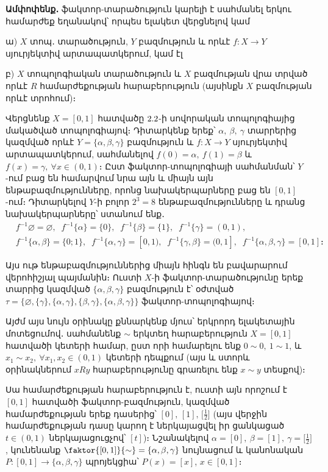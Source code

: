 \documentclass[./main.tex]{subfiles}
\begin{document}
\par \textbf{Ամփոփենք․} ֆակտոր-տարածություն կարելի է սահմանել երկու համարժեք եղա\-նա\-կով՝ որպես ելակետ վերցնելով կամ 
\par ա) $X$ տոպ․ տարածություն, $Y$ բազմություն և որևէ $f:X\to Y$ սյուրյեկտիվ արտապատ\-կերում, կամ էլ 
\par բ) $X$ տոպոլոգիական տարածություն և $X$ բազմության վրա տրված որևէ $R$ հա\-մար\-ժե\-քութ\-յան հարաբերություն (այսինքն $X$ բազմության որևէ տրոհում)։ 
\begin{example}\label{ch12ex1}
\par Վերցնենք $X=[0, 1]$ հատվածը $2.2$-ի սովորական տոպոլոգիայից մա\-կածված տոպոլոգիայով։ Դիտարկենք երեք՝ $\alpha,\ \beta,\ \gamma$ տարրերից կազմված որևէ $ Y=\{\alpha,\beta,\gamma\}$ բազմություն և $f:X\to Y$ սյուրյեկտիվ արտապատկերում, սահմանե\-լով $f(0)=\alpha,\ f(1)=\beta$ և $f(x)=\gamma,\ \forall x \in (0,1)$։ Ըստ ֆակտոր-տոպոլո\-գիայի սահ\-ման\-ման՝ $Y$-ում բաց են համարվում նրա այն և միայն այն ենթաբազմությունները, որոնց նախակերպարները բաց են $[0,1]$-ում։ Դիտարկելով $Y$-ի բոլոր $2^3=8$ են\-թա\-բազ\-մութ\-յուն\-նե\-րը և դրանց նախակերպարները՝ ստանում ենք․
\begin{align*}
&f^{-1}\varnothing= \varnothing, \;\; f^{-1}\{\alpha\} = \{0\}, \;\; f^{-1}\{\beta\} = \{1\}, \;\; f^{-1}\{\gamma\} = (0,1), \\ &f^{-1}\{\alpha,\beta\} = \{0;1\}, \;\; f^{-1}\{\alpha,\gamma\} = [0,1), \;\; f^{-1}\{\gamma,\beta\} = (0,1], \;\; f^{-1}\{\alpha,\beta,\gamma\} = [0,1]։
\end{align*}

\par Այս ութ ենթաբազմություններից միայն հինգն են բավարարում վե\-րո\-հիշ\-յալ պայ\-մանին։ Ուստի $X$-ի ֆակտոր-տարածությունը երեք տարրից կազմված $\{\alpha,\beta,\gamma\}$ բազ\-մություն է՝ օժտված $\tau = \{\varnothing,\{\gamma\},\{\alpha,\gamma\},\{\beta,\gamma\},\{\alpha,\beta,\gamma\}\}$ ֆակտոր-տո\-պո\-լո\-գիա\-յով։

\par Այժմ այս նույն օրինակը քննարկենք մյուս՝ երկրորդ ելակետային մոտեցումով․ սահմանենք $\sim$ երկտեղ հարաբերություն $X=[0,1]$ հատվածի կետերի համար, ըստ որի համարելու ենք $0\sim 0,\ 1\sim 1$, և $x_1\sim x_2,\ \forall x_1,x_2\in(0,1)$ կետերի դեպքում (այս և ստորև օրինակներում $xRy$ հարաբերությունը գրառելու ենք $x\sim y$ տեսքով)։

\par Սա համարժեքության հարաբերություն է, ուստի այն որոշում է $[0,1]$ հատվա\-ծի ֆակտոր-բազմություն, կազմված համարժեքության երեք դասերից՝ $[0],\, [1],\, \big[\frac{1}{2}\big]$ (այս վերջին հա\-մար\-ժե\-քութ\-յան դասը կարող է ներկայացվել իր ցանկացած ${t\in(0,1)}$ ներկայացուցչով՝ $[t]$)։ Նշանակելով $\alpha =[0],\ \beta=[1],\ \gamma=\big[\frac{1}{2}\big]$, կունենանք $\faktor{[0,1]}{\sim}=\{\alpha,\beta,\gamma\}$ նույնացում և կանոնական $P:[0,1]\to\{\alpha,\beta,\gamma\}$ պրոյեկցիա՝ $P(x)=[x]$, $x\in [0,1]$։


\end{example}
\end{document}
